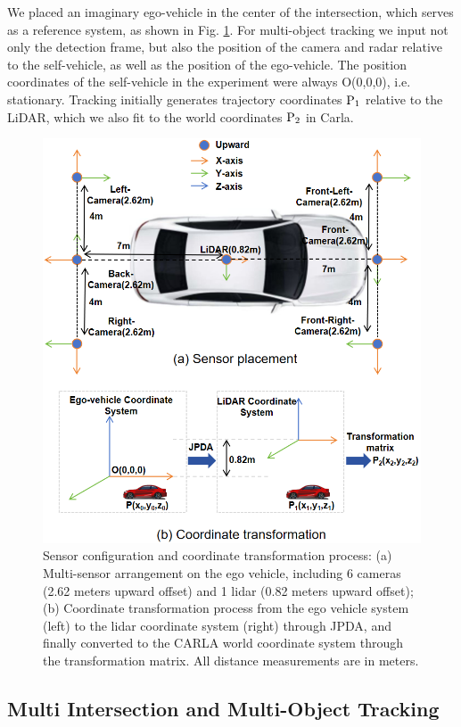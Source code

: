 \documentclass[lettersize,journal]{IEEEtran}
\begin{document}
We placed an imaginary ego-vehicle in the center of the intersection, which serves as a reference system, as shown in Fig. \ref{fig:3}. 
For multi-object tracking we input not only the detection frame, but also the position of the camera and radar relative to the self-vehicle, as well as the position of the ego-vehicle. 
The position coordinates of the self-vehicle in the experiment were always O(0,0,0), i.e. stationary. 
Tracking initially generates trajectory coordinates \(\text P_1\) relative to the LiDAR, which we also fit to the world coordinates \(\text P_2\) in Carla.
\begin{figure}[t]
	\centering
	\includegraphics[width=\linewidth]{picture/picture3.png} 
	\caption{Sensor configuration and coordinate transformation process: (a) Multi-sensor arrangement on the ego vehicle, including 6 cameras (2.62 meters upward offset) and 1 lidar (0.82 meters upward offset); (b) Coordinate transformation process from the ego vehicle system (left) to the lidar coordinate system (right) through JPDA, and finally converted to the CARLA world coordinate system through the transformation matrix. All distance measurements are in meters.} 
	\label{fig:3} 
\end{figure}

\subsection{Multi Intersection and Multi-Object Tracking}
\end{document}
